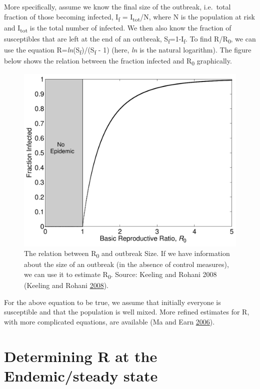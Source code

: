 \documentclass[]{book}
\theoremstyle{definition}
\theoremstyle{definition}
\theoremstyle{definition}
\theoremstyle{remark}
\begin{document}
More specifically, assume we know the final size of the outbreak,
i.e.~total fraction of those becoming infected, I\textsubscript{f} =
I\textsubscript{tot}/N, where N is the population at risk and
I\textsubscript{tot} is the total number of infected. We then also know
the fraction of susceptibles that are left at the end of an outbreak,
S\textsubscript{f}=1-I\textsubscript{f}. To find R/R\textsubscript{0},
we can use the equation
R=\emph{ln}(S\textsubscript{f})/(S\textsubscript{f} - 1) (here,
\emph{ln} is the natural logarithm). The figure below shows the relation
between the fraction infected and R\textsubscript{0} graphically.

\begin{figure}
\centering
\includegraphics{./images/outbreaksize.pdf}
\caption{\label{fig:outbreaksize}The relation between R\textsubscript{0} and
outbreak Size. If we have information about the size of an outbreak (in
the absence of control measures), we can use it to estimate
R\textsubscript{0}. Source: Keeling and Rohani 2008 (Keeling and Rohani
\protect\hyperlink{ref-keeling08}{2008}).}
\end{figure}

For the above equation to be true, we assume that initially everyone is
susceptible and that the population is well mixed. More refined
estimates for R, with more complicated equations, are available (Ma and
Earn \protect\hyperlink{ref-ma06}{2006}).

\section{Determining R at the Endemic/steady
state}\label{determining-r-at-the-endemicsteady-state}
\end{document}
